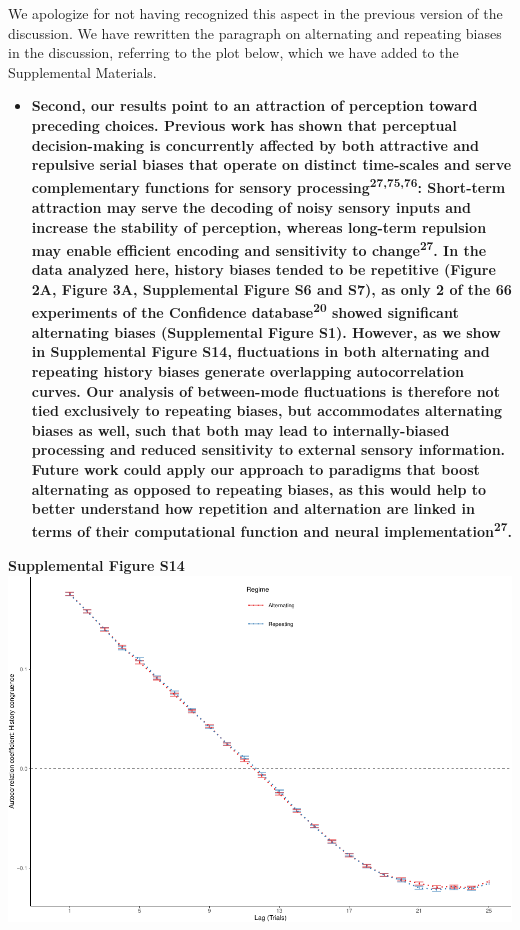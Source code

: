 \documentclass[
]{article}
\providecommand{\tightlist}{%
  \setlength{\itemsep}{0pt}\setlength{\parskip}{0pt}}
\begin{document}
We apologize for not having recognized this aspect in the previous
version of the discussion. We have rewritten the paragraph on
alternating and repeating biases in the discussion, referring to the
plot below, which we have added to the Supplemental Materials.

\begin{itemize}
\tightlist
\item
  \textbf{Second, our results point to an attraction of perception
  toward preceding choices. Previous work has shown that perceptual
  decision-making is concurrently affected by both attractive and
  repulsive serial biases that operate on distinct time-scales and serve
  complementary functions for sensory
  processing\textsuperscript{27,75,76}: Short-term attraction may serve
  the decoding of noisy sensory inputs and increase the stability of
  perception, whereas long-term repulsion may enable efficient encoding
  and sensitivity to change\textsuperscript{27}. In the data analyzed
  here, history biases tended to be repetitive (Figure 2A, Figure 3A,
  Supplemental Figure S6 and S7), as only 2 of the 66 experiments of the
  Confidence database\textsuperscript{20} showed significant alternating
  biases (Supplemental Figure S1). However, as we show in Supplemental
  Figure S14, fluctuations in both alternating and repeating history
  biases generate overlapping autocorrelation curves. Our analysis of
  between-mode fluctuations is therefore not tied exclusively to
  repeating biases, but accommodates alternating biases as well, such
  that both may lead to internally-biased processing and reduced
  sensitivity to external sensory information. Future work could apply
  our approach to paradigms that boost alternating as opposed to
  repeating biases, as this would help to better understand how
  repetition and alternation are linked in terms of their computational
  function and neural implementation\textsuperscript{27}.}
\end{itemize}

\textbf{Supplemental Figure S14}
\includegraphics{modes_mouse_rev1b_files/figure-latex/Supplemental_Figure_S14_print-1.pdf}
\end{document}
